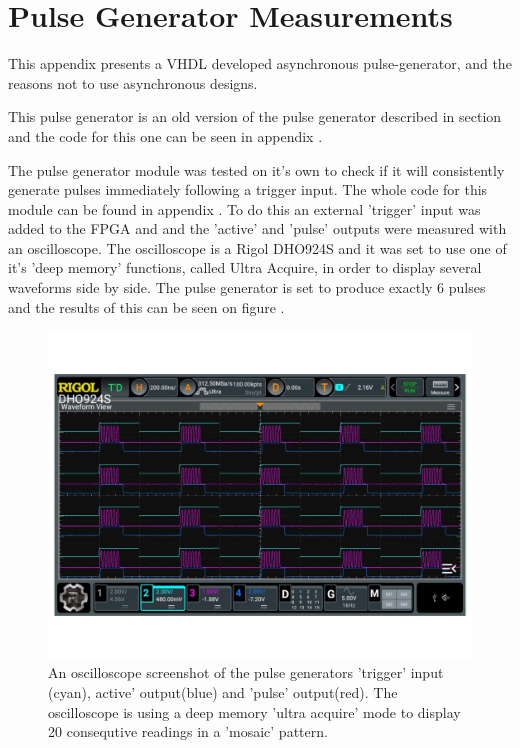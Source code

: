 \chapter{Pulse Generator Measurements} \label{App:PulseGenTest}
This appendix presents a VHDL developed asynchronous pulse-generator, and the reasons not to use asynchronous designs.

This pulse generator is an old version of the pulse generator described in section  and the code for this one can be seen in appendix .

The pulse generator module was tested on it's own to check if it will consistently generate pulses immediately following a trigger input. The whole code for this module can be found in appendix . To do this an external 'trigger' input was added to the FPGA and and the 'active' and 'pulse' outputs were measured with an oscilloscope. The oscilloscope is a Rigol DHO924S and it was set to use one of it's 'deep memory' functions, called Ultra Acquire, in order to display several waveforms side by side. The pulse generator is set to produce exactly 6 pulses and the results of this can be seen on figure .

\begin{figure}[H]
    \centering
    \includegraphics[clip, trim=0 50 0 50, width=1\textwidth]{Appendix/Figures/A_PulseGen_Test.pdf}
    \caption{An oscilloscope screenshot of the pulse generators 'trigger' input (cyan), active' output(blue) and 'pulse' output(red). The oscilloscope is using a deep memory 'ultra acquire' mode to display 20 consequtive readings in a 'mosaic' pattern.}
    \label{fig:A_PulseGen_Test}
\end{figure}

